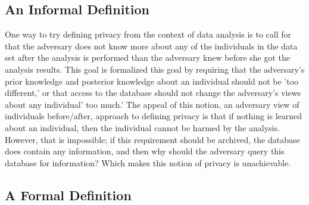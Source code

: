 \documentclass[11pt]{article}
\theoremstyle{definition}
\begin{document}




\subsection{An Informal Definition}
One way to try defining privacy from the context of data analysis is to call for that the adversary does not know more about any of the individuals in the data set after the analysis is performed than the adversary knew before she got the analysis results. This goal is formalized this goal by
requiring that the adversary's prior knowledge and posterior knowledge about an individual should not be 'too different,' or that access to the database should not change the adversary's views about any individual' too much.'
The appeal of this notion, an adversary view of individuals before/after, approach to defining privacy is that if nothing is learned about an individual, then the individual cannot be harmed by the analysis. However, that is impossible; if this requirement should be archived, the database does contain any information, and then why should the adversary query this database for information? Which makes this notion of privacy is unachievable.


\subsection{A Formal Definition}
\end{document}
